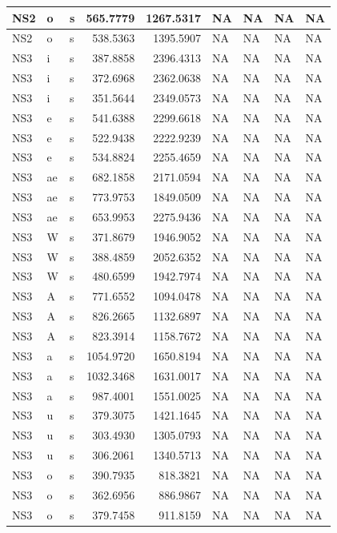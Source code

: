 \documentclass[man, fleqn, noextraspace]{apa6}
\begin{document}
\begin{tabular}{l|l|l|r|r|l|l|l|l}
\hline
NS2 & o & s & 565.7779 & 1267.5317 & NA & NA & NA & NA\\
\hline
NS2 & o & s & 538.5363 & 1395.5907 & NA & NA & NA & NA\\
\hline
NS3 & i & s & 387.8858 & 2396.4313 & NA & NA & NA & NA\\
\hline
NS3 & i & s & 372.6968 & 2362.0638 & NA & NA & NA & NA\\
\hline
NS3 & i & s & 351.5644 & 2349.0573 & NA & NA & NA & NA\\
\hline
NS3 & e & s & 541.6388 & 2299.6618 & NA & NA & NA & NA\\
\hline
NS3 & e & s & 522.9438 & 2222.9239 & NA & NA & NA & NA\\
\hline
NS3 & e & s & 534.8824 & 2255.4659 & NA & NA & NA & NA\\
\hline
NS3 & ae & s & 682.1858 & 2171.0594 & NA & NA & NA & NA\\
\hline
NS3 & ae & s & 773.9753 & 1849.0509 & NA & NA & NA & NA\\
\hline
NS3 & ae & s & 653.9953 & 2275.9436 & NA & NA & NA & NA\\
\hline
NS3 & W & s & 371.8679 & 1946.9052 & NA & NA & NA & NA\\
\hline
NS3 & W & s & 388.4859 & 2052.6352 & NA & NA & NA & NA\\
\hline
NS3 & W & s & 480.6599 & 1942.7974 & NA & NA & NA & NA\\
\hline
NS3 & A & s & 771.6552 & 1094.0478 & NA & NA & NA & NA\\
\hline
NS3 & A & s & 826.2665 & 1132.6897 & NA & NA & NA & NA\\
\hline
NS3 & A & s & 823.3914 & 1158.7672 & NA & NA & NA & NA\\
\hline
NS3 & a & s & 1054.9720 & 1650.8194 & NA & NA & NA & NA\\
\hline
NS3 & a & s & 1032.3468 & 1631.0017 & NA & NA & NA & NA\\
\hline
NS3 & a & s & 987.4001 & 1551.0025 & NA & NA & NA & NA\\
\hline
NS3 & u & s & 379.3075 & 1421.1645 & NA & NA & NA & NA\\
\hline
NS3 & u & s & 303.4930 & 1305.0793 & NA & NA & NA & NA\\
\hline
NS3 & u & s & 306.2061 & 1340.5713 & NA & NA & NA & NA\\
\hline
NS3 & o & s & 390.7935 & 818.3821 & NA & NA & NA & NA\\
\hline
NS3 & o & s & 362.6956 & 886.9867 & NA & NA & NA & NA\\
\hline
NS3 & o & s & 379.7458 & 911.8159 & NA & NA & NA & NA\\
\hline
\end{tabular}
\end{document}
